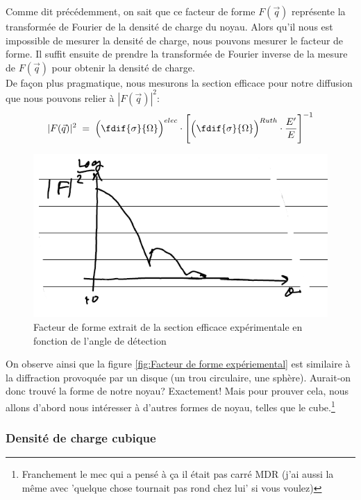 Comme dit précédemment, on sait que ce facteur de forme $F(\vec{q})$ représente la transformée de Fourier de la densité de charge du noyau. Alors qu'il nous est impossible de mesurer la densité de charge, nous pouvons mesurer le facteur de forme. Il suffit ensuite de prendre la transformée de Fourier inverse de la mesure de $F(\vec{q})$ pour obtenir la densité de charge.\\
De façon plus pragmatique, nous mesurons la section efficace pour notre diffusion que nous pouvons relier à $|F(\vec{q})|^2$:
\begin{equation*}
    |F(\vec{q})|^2 \eq
    \Big( \fdif{\sigma}{\Omega} \Big)^{elec}
    \cdot
    \Bigg[
    \Big( \fdif{\sigma}{\Omega} \Big)^{Ruth}
    \cdot \dfrac{E'}{E}
    \Bigg]^{-1}
\end{equation*}
\begin{figure}[H]
    \centering
    \includegraphics[scale=0.80]{Images4/graphe 2.PNG}
    \caption{Facteur de forme extrait de la section efficace expérimentale en fonction de l'angle de détection}
    \label{fig:Facteur de forme expériemental}
\end{figure}
On observe ainsi que la figure \eqref{fig:Facteur de forme expériemental} est similaire à la diffraction provoquée par un disque (un trou circulaire, une sphère). Aurait-on donc trouvé la forme de notre noyau? Exactement! Mais pour prouver cela, nous allons d'abord nous intéresser à d'autres formes de noyau, telles que le cube.\footnote{Franchement le mec qui a pensé à ça il était pas carré MDR (j'ai aussi la même avec 'quelque chose tournait pas rond chez lui' si vous voulez)}


    \subsubsection{Densité de charge cubique}


